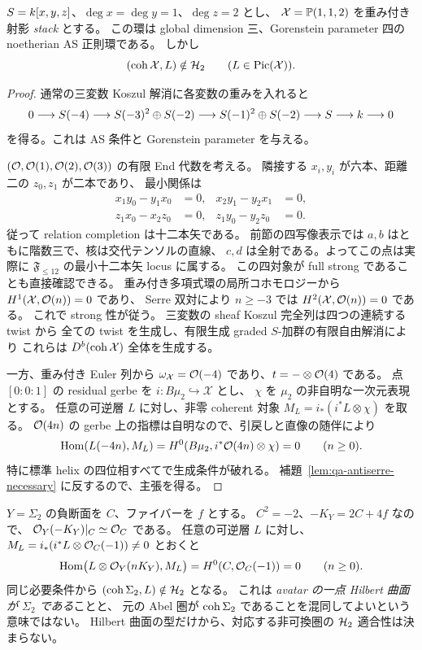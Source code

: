 \begin{example}
\label{ex:qa-weighted-not-h2}
\(S=k[x,y,z]\)、\(\deg x=\deg y=1\)、\(\deg z=2\) とし、
\(\mathcal X=\mathbb P(1,1,2)\) を重み付き射影 \emph{stack} とする。
この環は global dimension 三、Gorenstein parameter 四の
noetherian AS 正則環である。
しかし
\[
 (\operatorname{coh}\mathcal X,L)\notin\mathcal H_2\qquad(L\in\operatorname{Pic}(\mathcal X)).
\]
\end{example}
\begin{proof}
通常の三変数 Koszul 解消に各変数の重みを入れると
\[
 0\longrightarrow S(-4)
 \longrightarrow S(-3)^2\oplus S(-2)
 \longrightarrow S(-1)^2\oplus S(-2)
 \longrightarrow S\longrightarrow k\longrightarrow0
\]
を得る。これは AS 条件と Gorenstein parameter を与える。

\((\mathcal O,\mathcal O(1),\mathcal O(2),\mathcal O(3))\) の有限 End 代数を考える。
隣接する \(x_i,y_i\) が六本、距離二の \(z_0,z_1\) が二本であり、
最小関係は
\[
 \begin{aligned}
 x_1y_0-y_1x_0&=0,&x_2y_1-y_2x_1&=0,\\
 z_1x_0-x_2z_0&=0,&z_1y_0-y_2z_0&=0.
 \end{aligned}
\]
従って relation completion は十二本矢である。
前節の四写像表示では \(a,b\) はともに階数三で、核は交代テンソルの直線、
\(c,d\) は全射である。よってこの点は実際に
\(\mathfrak F_{\le12}\) の最小十二本矢 locus に属する。
この四対象が full strong であることも直接確認できる。
重み付き多項式環の局所コホモロジーから
\(H^1(\mathcal X,\mathcal O(n))=0\) であり、
Serre 双対により \(n\ge-3\) では \(H^2(\mathcal X,\mathcal O(n))=0\) である。
これで strong 性が従う。
三変数の sheaf Koszul 完全列は四つの連続する twist から
全ての twist を生成し、有限生成 graded \(S\)-加群の有限自由解消により
これらは \(D^b(\operatorname{coh}\mathcal X)\) 全体を生成する。

一方、重み付き Euler 列から
\(\omega_{\mathcal X}=\mathcal O(-4)\) であり、\(t=-\otimes\mathcal O(4)\) である。
点 \([0:0:1]\) の residual gerbe を
\(i:B\mu_2\hookrightarrow\mathcal X\) とし、
\(\chi\) を \(\mu_2\) の非自明な一次元表現とする。
任意の可逆層 \(L\) に対し、非零 coherent 対象
\(M_L=i_*(i^*L\otimes\chi)\) を取る。
\(\mathcal O(4n)\) の gerbe 上の指標は自明なので、引戻しと直像の随伴により
\[
 \operatorname{Hom}(L(-4n),M_L)=
 H^0(B\mu_2,i^*\mathcal O(4n)\otimes\chi)=0\qquad(n\ge0).
\]
特に標準 helix の四位相すべてで生成条件が破れる。
補題~\ref{lem:qa-antiserre-necessary} に反するので、主張を得る。
\end{proof}

\begin{example}
\label{ex:qa-hirzebruch-not-h2}
\(Y=\Sigma_2\) の負断面を \(C\)、ファイバーを \(f\) とする。
\(C^2=-2\)、\(-K_Y=2C+4f\) なので、
\(\mathcal O_Y(-K_Y)|_C\simeq\mathcal O_C\) である。
任意の可逆層 \(L\) に対し、
\(M_L=i_*(i^*L\otimes\mathcal O_C(-1))\ne0\) とおくと
\[
 \operatorname{Hom}\bigl(L\otimes\mathcal O_Y(nK_Y),M_L\bigr)
   =H^0(C,\mathcal O_C(-1))=0\qquad(n\ge0).
\]
同じ必要条件から \((\operatorname{coh}\Sigma_2,L)\notin\mathcal H_2\) となる。
これは \emph{avatar の一点 Hilbert 曲面が \(\Sigma_2\) である}ことと、
元の Abel 圏が \(\operatorname{coh}\Sigma_2\) であることを混同してよいという意味ではない。
Hilbert 曲面の型だけから、対応する非可換圏の \(\mathcal H_2\) 適合性は決まらない。
\end{example}

